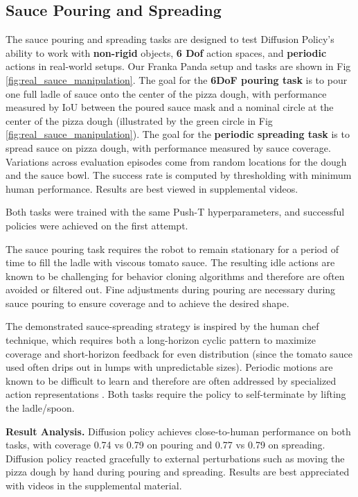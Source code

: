 \subsection{Sauce Pouring and Spreading}
The sauce pouring and spreading tasks are designed to test Diffusion Policy's ability to work with \textbf{non-rigid} objects, \textbf{6 Dof} action spaces, and \textbf{periodic} actions in real-world setups. Our Franka Panda setup and tasks are shown in Fig \ref{fig:real_sauce_manipulation}. The goal for the \textbf{6DoF pouring task} is to pour one full ladle of sauce onto the center of the pizza dough, with performance measured by IoU between the poured sauce mask and a nominal circle at the center of the pizza dough (illustrated by the green circle in Fig \ref{fig:real_sauce_manipulation}). 
The goal for the \textbf{periodic spreading task} is to spread sauce on pizza dough, with performance measured by sauce coverage. 
Variations across evaluation episodes come from random locations for the dough and the sauce bowl. 
The success rate is computed by thresholding with minimum human performance. 
Results are best viewed in supplemental videos. 

Both tasks were trained with the same Push-T hyperparameters, and successful policies were achieved on the first attempt.

The sauce pouring task requires the robot to remain stationary for a period of time to fill the ladle with viscous tomato sauce. The resulting idle actions are known to be challenging for behavior cloning algorithms and therefore are often avoided or filtered out. Fine adjustments during pouring are necessary during sauce pouring to ensure coverage and to achieve the desired shape.

The demonstrated sauce-spreading strategy is inspired by the human chef technique, which requires both a long-horizon cyclic pattern to maximize coverage and short-horizon feedback for even distribution (since the tomato sauce used often drips out in lumps with unpredictable sizes). Periodic motions are known to be difficult to learn and therefore are often addressed by specialized action representations \cite{yang2022periodic}.
Both tasks require the policy to self-terminate by lifting the ladle/spoon.









\textbf{Result Analysis.}
Diffusion policy achieves close-to-human performance on both tasks, with coverage 0.74 vs 0.79 on pouring and 0.77 vs 0.79 on spreading. 
Diffusion policy reacted gracefully to external perturbations such as moving the pizza dough by hand during pouring and spreading. 
Results are best appreciated with videos in the supplemental material. 

